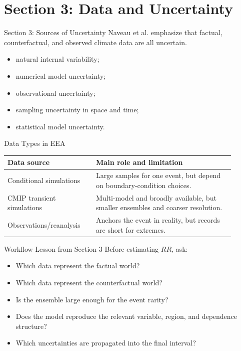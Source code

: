 \documentclass[aspectratio=169]{beamer}
\begin{document}
\section{Section 3: Data and Uncertainty}

\begin{frame}{Section 3: Sources of Uncertainty}
  Naveau et al. emphasize that factual, counterfactual, and observed climate data are all uncertain.

  \begin{itemize}
    \item natural internal variability;
    \item numerical model uncertainty;
    \item observational uncertainty;
    \item sampling uncertainty in space and time;
    \item statistical model uncertainty.
  \end{itemize}
\end{frame}

\begin{frame}{Data Types in EEA}
  \begin{tabular}{p{0.35\linewidth}p{0.55\linewidth}}
    \toprule
    Data source & Main role and limitation \\
    \midrule
    Conditional simulations & Large samples for one event, but depend on boundary-condition choices. \\
    CMIP transient simulations & Multi-model and broadly available, but smaller ensembles and coarser resolution. \\
    Observations/reanalysis & Anchors the event in reality, but records are short for extremes. \\
    \bottomrule
  \end{tabular}
\end{frame}

\begin{frame}{Workflow Lesson from Section 3}
  Before estimating $RR$, ask:
  \begin{itemize}
    \item Which data represent the factual world?
    \item Which data represent the counterfactual world?
    \item Is the ensemble large enough for the event rarity?
    \item Does the model reproduce the relevant variable, region, and dependence structure?
    \item Which uncertainties are propagated into the final interval?
  \end{itemize}
\end{frame}
\end{document}
